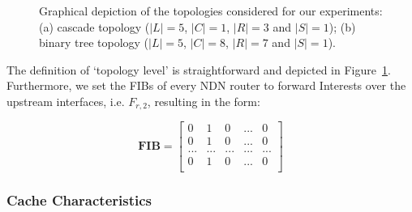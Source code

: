 \begin{figure}[h!]
    \centering


    \cprotect\caption{Graphical depiction of the topologies considered for 
        our experiments: (a) cascade topology ($|L| = 5$, $|C| = 1$, $|R| = 3$ 
        and $|S| = 1$); (b) binary tree topology 
        ($|L| = 5$, $|C| = 8$, $|R| = 7$ and $|S| = 1$).}
    \label{fig:exp-setup-nettop}

\end{figure}

The definition of `topology level' is straightforward and depicted 
in Figure~\ref{fig:exp-setup-nettop}. Furthermore, we set the FIBs of every 
NDN router to forward Interests over the upstream interfaces, i.e. $F_{r,2}$, 
resulting in the form:

\begin{equation}
\textbf{FIB} = \begin{bmatrix} 
                0 & 1 & 0 & ... & 0                 \\ 
                0 & 1 & 0 & ... & 0                 \\ 
                ... & ... & ... & ... & ...         \\ 
                0 & 1 & 0 & ... & 0                 \\ \end{bmatrix}
    \label{eq:fib-exp}
\end{equation}\shortvertbreak

\subsubsection{Cache Characteristics}
\label{subsec:exp-setup-cache}

